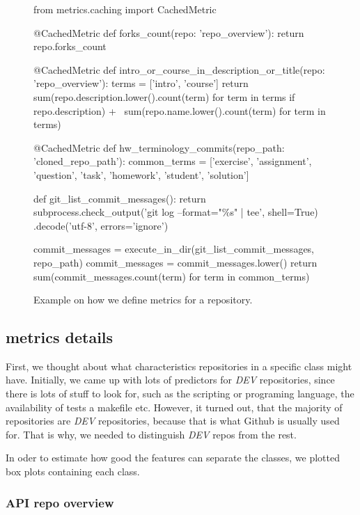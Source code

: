 \documentclass[a4paper]{scrartcl}
\begin{document}
	\begin{figure}[htb]
		\begin{python}
from metrics.caching import CachedMetric

@CachedMetric
def forks_count(repo: 'repo_overview'):
    return repo.forks_count

@CachedMetric
def intro_or_course_in_description_or_title(repo: 'repo_overview'):
    terms = ['intro', 'course']
    return sum(repo.description.lower().count(term) for term in terms if repo.description) + \
           sum(repo.name.lower().count(term) for term in terms)

@CachedMetric
def hw_terminology_commits(repo_path: 'cloned_repo_path'):
    common_terms = ['exercise', 'assignment', 'question', 'task', 'homework', 'student', 'solution']

    def git_list_commit_messages():
        return subprocess.check_output('git log --format="\%s" | tee', shell=True)
        	.decode('utf-8', errors='ignore')

    commit_messages = execute_in_dir(git_list_commit_messages, repo_path)
    commit_messages = commit_messages.lower()
    return sum(commit_messages.count(term) for term in common_terms)
		\end{python}
		\caption{Example on how we define metrics for a repository.}
		\label{fig:metrics}
	\end{figure}


	\clearpage

	\subsection{metrics details} %
	\label{sub:metrics_details}

	First, we thought about what characteristics repositories in a specific class might have. Initially, we came up with lots of predictors for \emph{DEV} repositories, since there is lots of stuff to look for, such as the scripting or programing language, the availability of tests a makefile etc. However, it turned out, that the majority of repositories are \emph{DEV} repositories, because that is what Github is usually used for. That is why, we needed to distinguish \emph{DEV} repos from the rest.

	In oder to estimate how good the features can separate the classes, we plotted box plots containing each class.

		\subsubsection{API repo overview} %
		\label{ssub:api_repo_overview}
\end{document}
